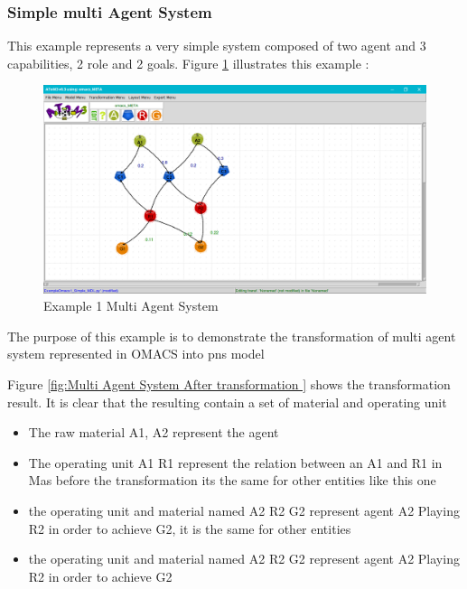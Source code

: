 \subsubsection{Simple multi Agent System }
This example represents a very simple system composed of  two agent and 3 capabilities, 2 role and 2 goals.
 Figure \ref{fig:Example 1 Multi Agent System } illustrates this example :
\begin{figure}[th]
	\centering
 	\includegraphics[scale=0.3]{ch3/img/omacs_model}
	\caption{\label{fig:Example 1 Multi Agent System }Example 1 Multi Agent System}
\end{figure} 

The purpose of this example is to demonstrate the transformation of multi agent system represented in OMACS into pns model

Figure \ref{fig:Multi Agent System After transformation } shows the transformation result.
It is clear that the resulting contain a set of material and operating unit
 
\begin{itemize}

\newcommand{\localtextbulletone}{\textcolor{gray}{\raisebox{.45ex}{\rule{.6ex}{.6ex}}}}
\renewcommand{\labelitemi}{\localtextbulletone}
\item The raw material A1, A2 represent the agent  
\item The operating unit A1 R1 represent the relation between an A1 and R1 
in Mas before the transformation its the same for other entities like this one
\item the operating unit and material named A2 R2 G2 represent agent A2 Playing R2 in order to achieve G2, it is the same for other entities  

\item the operating unit and material named A2 R2 G2 represent agent A2 Playing R2 in order to achieve G2 
\end{itemize}
  
